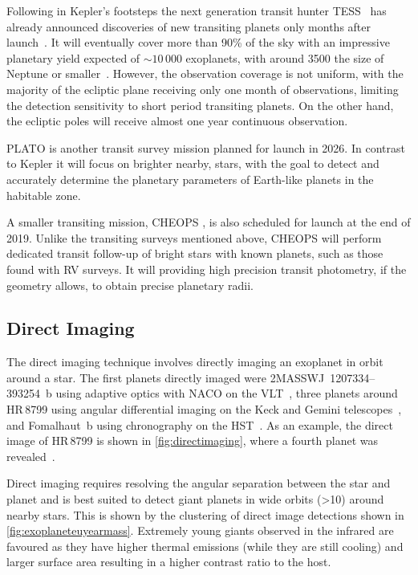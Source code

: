 Following in Kepler's footsteps the next generation transit hunter {TESS}~\citep{ricker_transiting_2015} has already announced discoveries of new transiting planets only months after launch~\citep{vanderspek_tess_2018, gandolfi_tess_2018, huang_tess_2018}.
It will eventually cover more than 90\% of the sky with an impressive planetary yield expected of $\sim10\,000$ exoplanets, with around 3500 the size of Neptune or smaller~\citep{barclay_revised_2018, huang_expected_2018}.
However, the observation coverage is not uniform, with the majority of the ecliptic plane receiving only one month of observations, limiting the detection sensitivity to short period transiting planets.
On the other hand, the ecliptic poles will receive almost one year continuous observation.

{PLATO} \citep{rauer_the_2014} is another transit survey mission planned for launch in 2026.
In contrast to Kepler it will focus on brighter nearby, stars, with the goal to detect and accurately determine the planetary parameters of Earth-like planets in the habitable zone.

A smaller transiting mission, {CHEOPS} \citep{broeg_cheops_2013}, is also scheduled for launch at the end of 2019.
Unlike the transiting surveys mentioned above, {CHEOPS} will perform dedicated transit follow-up of bright stars with known planets, such as those found with {RV} surveys.
It will providing high precision transit photometry, if the geometry allows, to obtain precise planetary radii.


\subsection{Direct Imaging}
\label{subsec:direct_detection}
The direct imaging technique involves directly imaging an exoplanet in orbit around a star.
The first planets directly imaged were {2MASSWJ~1207334--393254~b} using adaptive optics with NACO on the VLT~\citep{chauvin_giant_2004}, three planets around HR\,8799 using angular differential imaging on the Keck and Gemini telescopes~\citep{marois_direct_2008}, and {Fomalhaut~b} using chronography on the HST~\citep{kalas_optical_2008}.
As an example, the direct image of {HR\,8799} is shown in \cref{fig:directimaging}, where a fourth planet was revealed~\citep{marois_images_2010}.

Direct imaging requires resolving the angular separation between the star and planet and is best suited to detect giant planets in wide orbits (>10\AU{}) around nearby stars.
This is shown by the clustering of direct image detections shown in \cref{fig:exoplaneteuyearmass}.
Extremely young giants observed in the infrared are favoured as they have higher thermal emissions (while they are still cooling) and larger surface area resulting in a higher contrast ratio to the host.


